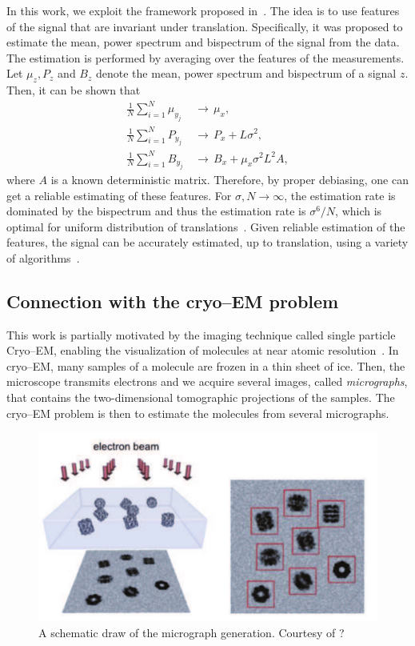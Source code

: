 \documentclass[journal]{IEEEtran}
\numberwithin{equation}{section}
\numberwithin{figure}{section}
\theoremstyle{plain}
\theoremstyle{definition}
\theoremstyle{remark}
\theoremstyle{plain}
\theoremstyle{remark}
\theoremstyle{plain}
\theoremstyle{plain}
\begin{document}
In this work, we exploit the framework proposed in~\cite{bendory2017bispectrum}. The idea is to use features of the signal that are invariant under translation. Specifically, it was proposed to estimate the mean, power spectrum and bispectrum of the signal from the data. The estimation is performed by averaging over the features of the measurements. Let $\mu_z,P_z$ and $B_z$ denote the mean, power spectrum and bispectrum of a signal $z$. Then, it can be shown that 
\begin{align}
\frac{1}{N}\sum_{i=1}^N\mu_{y_j}  &\,\to \, \mu_x, \\
\frac{1}{N}\sum_{i=1}^NP_{y_j}  &\,\to \, P_x + L\sigma^2, \\
\frac{1}{N}\sum_{i=1}^NB_{y_j}  &\,\to \, B_x + \mu_x\sigma^2L^2A, 
\end{align} 
where $A$ is a known deterministic matrix. Therefore, by proper debiasing, one can get a reliable estimating of these features. For $\sigma,N\to\infty$, the estimation rate is dominated by the bispectrum and thus the estimation rate is $\sigma^6/N$, which is optimal for uniform distribution of translations~\cite{bandeira2017optimal}. Given reliable estimation of the features, the signal can be accurately estimated, up to translation, using a variety of algorithms~\cite{bendory2017bispectrum}.




\subsection{Connection with the cryo--EM problem} \label{sec:cryoEM}

This work is partially motivated by the imaging
technique called single particle Cryo--EM, enabling the visualization of molecules at near atomic resolution~\cite{bartesaghi20152,sirohi20163}. In cryo--EM, many samples of a molecule are frozen in a thin sheet of ice. Then, the microscope transmits electrons and we acquire  several images, called \emph{micrographs}, that contains the two-dimensional tomographic projections of the samples. The  cryo--EM 
problem is then to estimate the molecules from several micrographs. 

\begin{figure}
	\begin{center}
		\includegraphics[scale = .4]{cryoem-eps-converted-to}
	\end{center}
	\caption{A schematic draw of the micrograph generation. Courtesy of ?}
	\label{fig:cryo-EM}
\end{figure}
\end{document}
